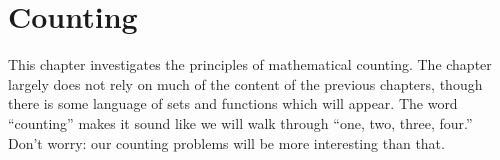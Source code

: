 \documentclass{book}
\theoremstyle{ekimcustom}
\begin{document}
%
%
%
%
%
%
%
%
%

\chapter{Counting}

This chapter investigates the principles of mathematical counting. The chapter largely does not rely on much of the content of the previous chapters, though there is some language of sets and functions which will appear. The word ``counting'' makes it sound like we will walk through ``one, two, three, four.'' Don't worry: our counting problems will be more interesting than that.
\end{document}
